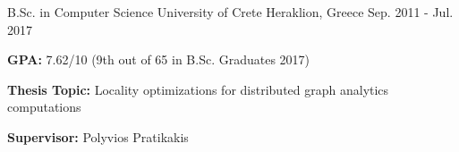\begin{cventries}
  \cventry
    {B.Sc. in Computer Science} %
    {University of Crete} %
    {Heraklion, Greece} %
    {Sep. 2011 - Jul. 2017} %
    {
      \begin{cvitems} %
      \item{\textbf{GPA:} 7.62/10 (9th out of 65 in B.Sc. Graduates 2017)}
      \item{\textbf{Thesis Topic:} Locality optimizations for
          distributed graph analytics computations}
        \item{\textbf{Supervisor:} Polyvios Pratikakis}
      \end{cvitems}
    }

\end{cventries}
